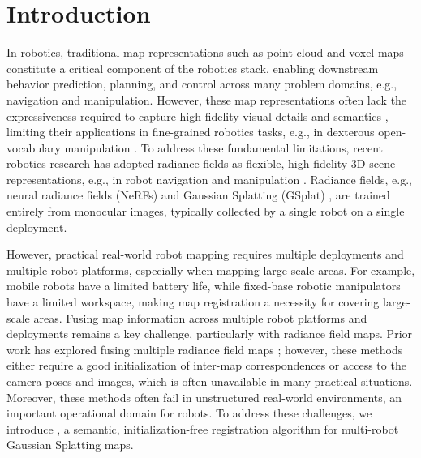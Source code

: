 \section{Introduction}
\label{sec:introduction}
In robotics, traditional map representations such as point-cloud and voxel maps constitute a critical component of the robotics stack, enabling downstream behavior prediction, planning, and control across many problem domains, e.g., navigation and manipulation. However, these map representations often lack the expressiveness required to capture high-fidelity visual details and semantics \cite{kerbl20233d}, limiting their applications in fine-grained robotics tasks, e.g., in dexterous open-vocabulary manipulation \cite{shen2023distilled}. To address these fundamental limitations, recent robotics research has adopted radiance fields as flexible, high-fidelity $3$D scene representations, e.g., in robot navigation \cite{chen2024splat, qiu2024learning} and manipulation \cite{rashid2023language, shorinwa2024splat}. Radiance fields, e.g., neural radiance fields (NeRFs) \cite{mildenhall2021nerf} and Gaussian Splatting (GSplat) \cite{kerbl20233d}, are trained entirely from monocular images, typically collected by a single robot on a single deployment.

However, practical real-world robot mapping requires multiple deployments and multiple robot platforms, especially when mapping large-scale areas. For example, mobile robots have a limited battery life, while fixed-base robotic manipulators have a limited workspace, making map registration a necessity for covering large-scale areas.
Fusing map information across multiple robot platforms and deployments remains a key challenge, particularly with radiance field maps.
Prior work has explored fusing multiple radiance field maps \cite{chang2025gaussreg, yuan2024photoreg}; however, these methods either require a good initialization of inter-map correspondences or access to the camera poses and images, which is often unavailable in many practical situations.
Moreover, these methods often fail in unstructured real-world environments, an important operational domain for robots.
To address these challenges, we introduce \emph{\algname}, a semantic, initialization-free registration algorithm for multi-robot Gaussian Splatting maps.

